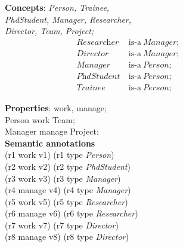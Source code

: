 \begin{figure}
	\begin{minipage}[t]{0.45\textwidth}
			\textbf{Concepts}: \textit{Person, Trainee,\\
			PhdStudent, Manager, Researcher,\\
			Director, Team,
			Project;}
			\begin{align}
			\textit{Researcher}\ &\text{is-a}\ \textit{Manager};&\\
			\textit{Director}\ &\text{is-a}\ \textit{Manager};&\\
			\textit{Manager}\ &\text{is-a}\ \textit{Person};&\\
			\textit{PhdStudent}\ &\text{is-a}\ \textit{Person};&\\
			\textit{Trainee}\ &\text{is-a}\ \textit{Person};&
			\end{align}
			
			\textbf{Properties}: work, manage;\\
			Person work Team;\\
			Manager manage Project;\\

		\textbf{Semantic annotations}\\
			(r1 work v1) (r1 type \textit{Person})\\
			(r2 work v2) (r2 type \textit{PhdStudent})\\
			(r3 work v3) (r3 type \textit{Manager})\\
			(r4 manage v4) (r4 type \textit{Manager})\\
			(r5 work v5) (r5 type \textit{Researcher})\\
			(r6 manage v6) (r6 type \textit{Researcher})\\
			(r7 work v7) (r7 type \textit{Director})\\
			(r8 manage v8) (r8 type \textit{Director})\\

	\end{minipage}
	\hspace{0.05\textwidth}
	\begin{minipage}[t]{0.45\textwidth}
		

\end{minipage}
\end{figure}
